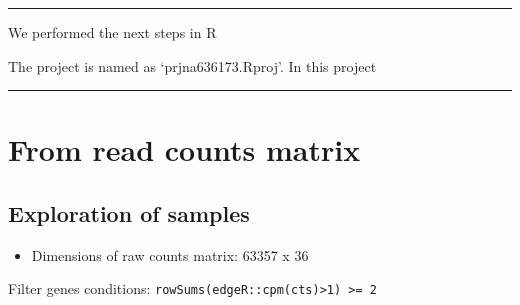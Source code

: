 \documentclass[
]{book}
\newenvironment{Shaded}{\begin{snugshade}}{\end{snugshade}}
\newcommand{\AttributeTok}[1]{\textcolor[rgb]{0.77,0.63,0.00}{#1}}
\newcommand{\CommentTok}[1]{\textcolor[rgb]{0.56,0.35,0.01}{\textit{#1}}}
\newcommand{\ControlFlowTok}[1]{\textcolor[rgb]{0.13,0.29,0.53}{\textbf{#1}}}
\newcommand{\DataTypeTok}[1]{\textcolor[rgb]{0.13,0.29,0.53}{#1}}
\newcommand{\ExtensionTok}[1]{#1}
\newcommand{\NormalTok}[1]{#1}
\newcommand{\OperatorTok}[1]{\textcolor[rgb]{0.81,0.36,0.00}{\textbf{#1}}}
\newcommand{\VariableTok}[1]{\textcolor[rgb]{0.00,0.00,0.00}{#1}}
\providecommand{\tightlist}{%
  \setlength{\itemsep}{0pt}\setlength{\parskip}{0pt}}
\begin{document}
\begin{Shaded}
\end{Shaded}

\begin{center}\rule{0.5\linewidth}{0.5pt}\end{center}

We performed the next steps in R

The project is named as `prjna636173.Rproj'. In this project

\begin{center}\rule{0.5\linewidth}{0.5pt}\end{center}

\hypertarget{from-read-counts-matrix}{%
\section{From read counts matrix}\label{from-read-counts-matrix}}

\hypertarget{exploration-of-samples}{%
\subsection{Exploration of samples}\label{exploration-of-samples}}

\begin{itemize}
\tightlist
\item
  Dimensions of raw counts matrix: 63357 x 36
\end{itemize}

Filter genes conditions: \texttt{rowSums(edgeR::cpm(cts)\textgreater{}1)\ \textgreater{}=\ 2}
\end{document}
